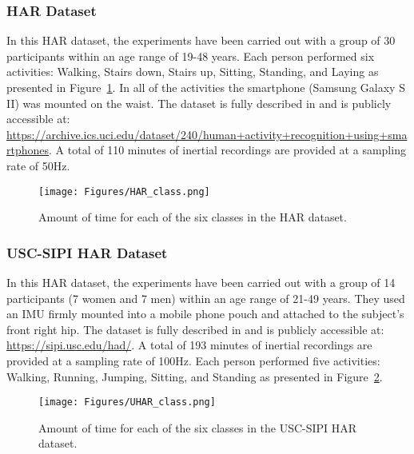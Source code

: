 \documentclass[journal]{IEEEtran}
\begin{document}
\subsubsection{HAR Dataset} \label{HAR1}
In this HAR dataset, the experiments have been carried out with a group of 30 participants within an age range of 19-48 years. Each person performed six activities:  Walking, Stairs down, Stairs up,  Sitting, Standing, and Laying as presented in Figure~\ref{fig:HAR_class}. In all of the activities the smartphone (Samsung Galaxy S II) was mounted on the waist. 
The  dataset is fully described in \cite{anguita2013public} and is publicly accessible at: \url{https://archive.ics.uci.edu/dataset/240/human+activity+recognition+using+smartphones}. A total of 110 minutes of inertial recordings are provided at a sampling rate of 50Hz.
%
\begin{figure}[h]
    \centering
    \texttt{[image: Figures/HAR\_class.png]}
    \caption{Amount of time for each of the six classes in the HAR dataset.}
    \label{fig:HAR_class}
\end{figure}
%
\subsubsection{USC-SIPI HAR Dataset} \label{USCSIPI}
In this HAR dataset, the experiments have been carried out with a group of 14 participants (7 women and 7 men) within an age range of 21-49 years. They used an IMU firmly mounted into a mobile phone pouch and attached to the subject’s front right hip. 
The  dataset is fully described in \cite{zhang2012usc} and is publicly accessible at: \url{https://sipi.usc.edu/had/}. A total of 193 minutes of inertial recordings are provided at a sampling rate of 100Hz.  Each person performed five activities:  Walking, Running, Jumping,  Sitting, and Standing as presented in Figure~\ref{fig:UHAR_class}.
%
\begin{figure}[h]
    \centering
    \texttt{[image: Figures/UHAR\_class.png]}
    \caption{Amount of time for each of the six classes in the USC-SIPI HAR dataset.}
    \label{fig:UHAR_class}
\end{figure}
%
\end{document}
